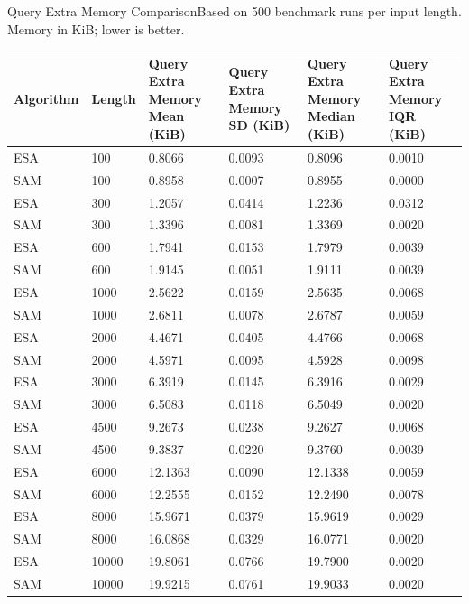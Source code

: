 \begin{benchmarktable}{Query Extra Memory Comparison}{Based on 500 benchmark runs per input length. Memory in KiB; lower is better.}
\begin{tabularx}{\textwidth}{|X|X|X|X|X|X|}
\toprule
Algorithm & Length & Query Extra Memory Mean (KiB) & Query Extra Memory SD (KiB) & Query Extra Memory Median (KiB) & Query Extra Memory IQR (KiB) \\
\midrule
ESA & 100 & 0.8066 & 0.0093 & 0.8096 & 0.0010 \\
SAM & 100 & 0.8958 & 0.0007 & 0.8955 & 0.0000 \\
\hline
ESA & 300 & 1.2057 & 0.0414 & 1.2236 & 0.0312 \\
SAM & 300 & 1.3396 & 0.0081 & 1.3369 & 0.0020 \\
\hline
ESA & 600 & 1.7941 & 0.0153 & 1.7979 & 0.0039 \\
SAM & 600 & 1.9145 & 0.0051 & 1.9111 & 0.0039 \\
\hline
ESA & 1000 & 2.5622 & 0.0159 & 2.5635 & 0.0068 \\
SAM & 1000 & 2.6811 & 0.0078 & 2.6787 & 0.0059 \\
\hline
ESA & 2000 & 4.4671 & 0.0405 & 4.4766 & 0.0068 \\
SAM & 2000 & 4.5971 & 0.0095 & 4.5928 & 0.0098 \\
\hline
ESA & 3000 & 6.3919 & 0.0145 & 6.3916 & 0.0029 \\
SAM & 3000 & 6.5083 & 0.0118 & 6.5049 & 0.0020 \\
\hline
ESA & 4500 & 9.2673 & 0.0238 & 9.2627 & 0.0068 \\
SAM & 4500 & 9.3837 & 0.0220 & 9.3760 & 0.0039 \\
\hline
ESA & 6000 & 12.1363 & 0.0090 & 12.1338 & 0.0059 \\
SAM & 6000 & 12.2555 & 0.0152 & 12.2490 & 0.0078 \\
\hline
ESA & 8000 & 15.9671 & 0.0379 & 15.9619 & 0.0029 \\
SAM & 8000 & 16.0868 & 0.0329 & 16.0771 & 0.0020 \\
\hline
ESA & 10000 & 19.8061 & 0.0766 & 19.7900 & 0.0020 \\
SAM & 10000 & 19.9215 & 0.0761 & 19.9033 & 0.0020 \\
\bottomrule
\end{tabularx}
\end{benchmarktable}


